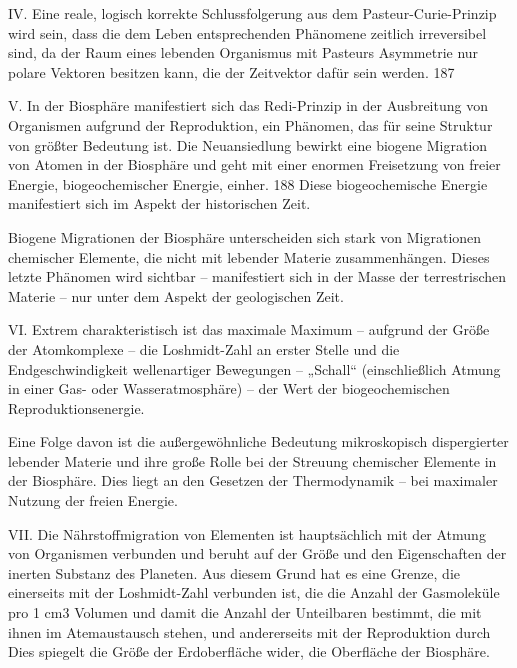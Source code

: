 \documentclass[11pt,a4paper]{book}
\begin{document}
IV. Eine reale, logisch korrekte Schlussfolgerung aus dem Pasteur-Curie-Prinzip wird sein, dass die dem Leben entsprechenden Phänomene zeitlich irreversibel sind, da der Raum eines lebenden Organismus mit Pasteurs Asymmetrie nur polare Vektoren besitzen kann, die der Zeitvektor dafür sein werden. 187



V. In der Biosphäre manifestiert sich das Redi-Prinzip in der Ausbreitung von Organismen aufgrund der Reproduktion, ein Phänomen, das für seine Struktur von größter Bedeutung ist. Die Neuansiedlung bewirkt eine biogene Migration von Atomen in der Biosphäre und geht mit einer enormen Freisetzung von freier Energie, biogeochemischer Energie, einher. 188 Diese biogeochemische Energie manifestiert sich im Aspekt der historischen Zeit.



Biogene Migrationen der Biosphäre unterscheiden sich stark von Migrationen chemischer Elemente, die nicht mit lebender Materie zusammenhängen. Dieses letzte Phänomen wird sichtbar -- manifestiert sich in der Masse der terrestrischen Materie -- nur unter dem Aspekt der geologischen Zeit.



VI. Extrem charakteristisch ist das maximale Maximum -- aufgrund der Größe der Atomkomplexe -- die Loshmidt-Zahl an erster Stelle und die Endgeschwindigkeit wellenartiger Bewegungen -- „Schall“ (einschließlich Atmung in einer Gas- oder Wasseratmosphäre) -- der Wert der biogeochemischen Reproduktionsenergie.



Eine Folge davon ist die außergewöhnliche Bedeutung mikroskopisch dispergierter lebender Materie und ihre große Rolle bei der Streuung chemischer Elemente in der Biosphäre. Dies liegt an den Gesetzen der Thermodynamik -- bei maximaler Nutzung der freien Energie.



VII. Die Nährstoffmigration von Elementen ist hauptsächlich mit der Atmung von Organismen verbunden und beruht auf der Größe und den Eigenschaften der inerten Substanz des Planeten. Aus diesem Grund hat es eine Grenze, die einerseits mit der Loshmidt-Zahl verbunden ist, die die Anzahl der Gasmoleküle pro 1 cm3 Volumen und damit die Anzahl der Unteilbaren bestimmt, die mit ihnen im Atemaustausch stehen, und andererseits mit der Reproduktion durch Dies spiegelt die Größe der Erdoberfläche wider, die Oberfläche der Biosphäre.
\end{document}
